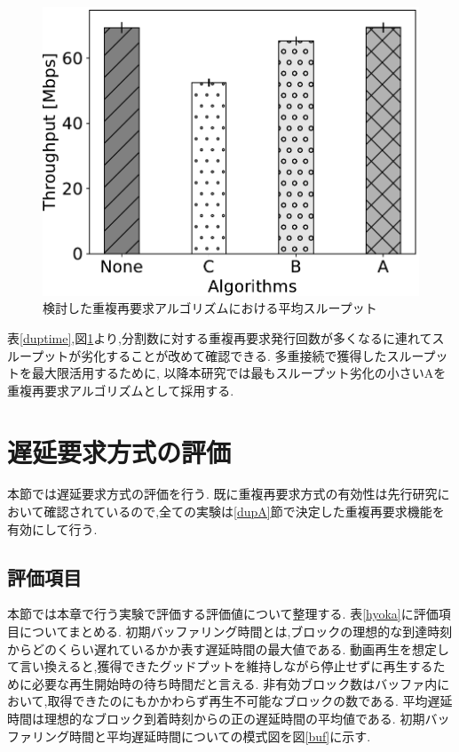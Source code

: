 \documentclass[a4j,12pt]{gradthesis_utf8}
\begin{document}
\begin{figure}[h]
	\label{dupthp}
	\centering
		\includegraphics[width=13cm]{figure/put.pdf}
		\caption{検討した重複再要求アルゴリズムにおける平均スループット}
\end{figure}

表\ref{duptime},図\ref{dupthp}より,分割数に対する重複再要求発行回数が多くなるに連れてスループットが劣化することが改めて確認できる.
多重接続で獲得したスループットを最大限活用するために,
以降本研究では最もスループット劣化の小さいAを重複再要求アルゴリズムとして採用する.

\newpage

\section{遅延要求方式の評価}
本節では遅延要求方式の評価を行う.
既に重複再要求方式の有効性は先行研究において確認されているので,全ての実験は\ref{dupA}節で決定した重複再要求機能を有効にして行う.

\subsection{評価項目}
\label{hyoukakoumoku}
本節では本章で行う実験で評価する評価値について整理する.
表\ref{hyoka}に評価項目についてまとめる.
初期バッファリング時間とは,ブロックの理想的な到達時刻からどのくらい遅れているかか表す遅延時間の最大値である.
動画再生を想定して言い換えると,獲得できたグッドプットを維持しながら停止せずに再生するために必要な再生開始時の待ち時間だと言える.
非有効ブロック数はバッファ内において,取得できたのにもかかわらず再生不可能なブロックの数である.
平均遅延時間は理想的なブロック到着時刻からの正の遅延時間の平均値である.
初期バッファリング時間と平均遅延時間についての模式図を図\ref{buf}に示す.
\end{document}
